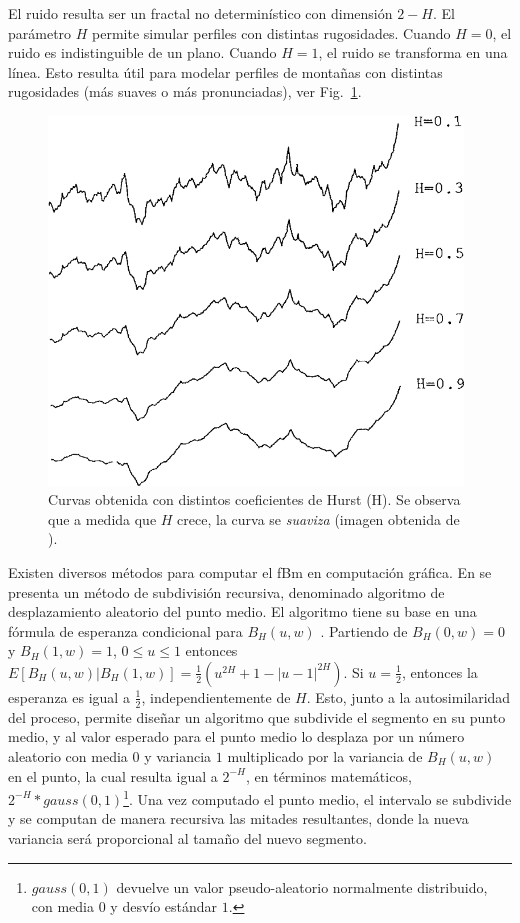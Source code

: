 El ruido resulta ser un fractal no determinístico con dimensión $2-H$.
El parámetro $H$ permite simular perfiles con distintas rugosidades.
Cuando $H = 0$, el ruido es indistinguible de un plano.
Cuando $H = 1$, el ruido se transforma en una línea.
Esto resulta útil para modelar perfiles de montañas con distintas rugosidades (más suaves o más pronunciadas), ver Fig.~\ref{fg:hurst}.

\begin{figure}
\center
\includegraphics[width=11cm]{figures/hurst}
\caption[Curvas obtenida con distintos coeficientes de Hurst.]{Curvas obtenida con distintos coeficientes de Hurst (H). Se observa que a medida que $H$ crece, la curva se {\em suaviza} (imagen obtenida de \cite{Peitgen1988}).}
\label{fg:hurst}
\end{figure}

Existen diversos métodos para computar el fBm en computación gráfica.
En \cite{Fournier1982} se presenta un método de subdivisión recursiva, denominado algoritmo de desplazamiento aleatorio del punto medio.
El algoritmo tiene su base en una fórmula de esperanza condicional para $B_{H}(u,w)$ \cite{Mandelbrot1968}.
Partiendo de $B_{H}(0,w) = 0$ y $B_{H}(1,w) = 1$, $0 \le u \le 1$ entonces $E[B_{H}(u,w)|B_{H}(1,w)] = \frac{1}{2} (u^{2H} + 1 - |u-1|^{2H})$.
Si $u=\frac{1}{2}$, entonces la esperanza es igual a $\frac{1}{2}$, independientemente de $H$.
Esto, junto a la autosimilaridad del proceso, permite diseñar un algoritmo que subdivide el segmento en su punto medio, y al valor esperado para el punto medio lo desplaza por un número aleatorio con media $0$ y variancia $1$ multiplicado por la variancia de $B_{H}(u,w)$ en el punto, la cual resulta igual a $2^{-H}$, en términos matemáticos, $2^{-H} * gauss(0,1) $\footnote{$gauss(0,1)$ devuelve un valor pseudo-aleatorio normalmente distribuido, con media $0$ y desvío estándar $1$. }.
Una vez computado el punto medio, el intervalo se subdivide y se computan de manera recursiva las mitades resultantes, donde la nueva variancia será proporcional al tamaño del nuevo segmento.

